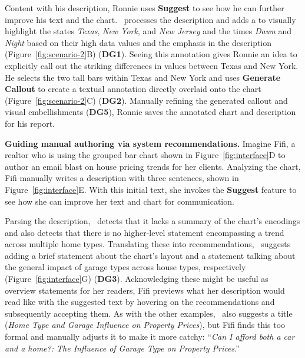 Content with his description, Ronnie uses {\small{}} \textbf{Suggest} to see how he can further improve his text and the chart.
\pluto~processes the description and adds a  to visually highlight the states \textit{Texas}, \textit{New York}, and \textit{New Jersey} and the times \textit{Dawn} and \textit{Night} based on their high data values and the emphasis in the description (Figure~\ref{fig:scenario-2}B) (\textbf{DG1}).
Seeing this annotation gives Ronnie an idea to explicitly call out the striking differences in values between Texas and New York.
He selects the two tall bars within Texas and New York and uses {\small{}} \textbf{Generate Callout} to create a textual annotation directly overlaid onto the chart (Figure~\ref{fig:scenario-2}C) (\textbf{DG2}).
Manually refining the generated callout and visual embellishments (\textbf{DG5}), Ronnie saves the annotated chart and description for his report.

\vspace{.5em}
\noindent\textbf{Guiding manual authoring via system recommendations.}
Imagine Fifi, a realtor who is using the grouped bar chart shown in Figure~\ref{fig:interface}D to author an email blast on house pricing trends for her clients.
Analyzing the chart, Fifi manually writes a description with three sentences, shown in Figure~\ref{fig:interface}E.
With this initial text, she invokes the {\small{}} \textbf{Suggest} feature to see how she can improve her text and chart for communication.

Parsing the description, \pluto~detects that it lacks a summary of the chart's encodings and also detects that there is no higher-level statement encompassing a trend across multiple home types.
Translating these into recommendations, \pluto~suggests adding a brief statement about the chart's layout and a statement talking about the general impact of garage types across house types, respectively (Figure~\ref{fig:interface}G) (\textbf{DG3}).
Acknowledging these might be useful as overview statements for her readers, Fifi previews what her description would read like with the suggested text by hovering on the recommendations and subsequently accepting them.
As with the other examples, \pluto~also suggests a title (\textit{Home Type and Garage Influence on Property Prices}), but Fifi finds this too formal and manually adjusts it to make it more catchy: ``\textit{Can I afford both a car and a home?: The Influence of Garage Type on Property Prices}.''

